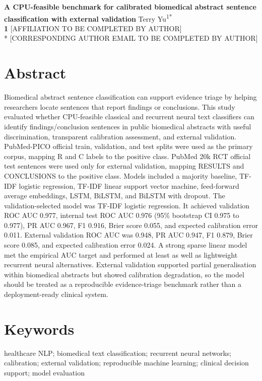 \documentclass[10pt,letterpaper]{article}
\begin{document}
\vspace*{0.2in}
\begin{flushleft}
{\Large\textbf{A CPU-feasible benchmark for calibrated biomedical abstract sentence classification with external validation}}
\newline
Terry Yu\textsuperscript{1*}
\\
\bigskip
\textbf{1} [AFFILIATION TO BE COMPLETED BY AUTHOR]
\\
\bigskip
* [CORRESPONDING AUTHOR EMAIL TO BE COMPLETED BY AUTHOR]
\end{flushleft}

\section*{Abstract}
Biomedical abstract sentence classification can support evidence triage by helping researchers locate sentences that report findings or conclusions. This study evaluated whether CPU-feasible classical and recurrent neural text classifiers can identify findings/conclusion sentences in public biomedical abstracts with useful discrimination, transparent calibration assessment, and external validation. PubMed-PICO official train, validation, and test splits were used as the primary corpus, mapping R and C labels to the positive class. PubMed 20k RCT official test sentences were used only for external validation, mapping RESULTS and CONCLUSIONS to the positive class. Models included a majority baseline, TF-IDF logistic regression, TF-IDF linear support vector machine, feed-forward average embeddings, LSTM, BiLSTM, and BiLSTM with dropout. The validation-selected model was TF-IDF logistic regression. It achieved validation ROC AUC 0.977, internal test ROC AUC 0.976 (95\% bootstrap CI 0.975 to 0.977), PR AUC 0.967, F1 0.916, Brier score 0.055, and expected calibration error 0.011. External validation ROC AUC was 0.948, PR AUC 0.947, F1 0.879, Brier score 0.085, and expected calibration error 0.024. A strong sparse linear model met the empirical AUC target and performed at least as well as lightweight recurrent neural alternatives. External validation supported partial generalisation within biomedical abstracts but showed calibration degradation, so the model should be treated as a reproducible evidence-triage benchmark rather than a deployment-ready clinical system.

\section*{Keywords}
healthcare NLP; biomedical text classification; recurrent neural networks; calibration; external validation; reproducible machine learning; clinical decision support; model evaluation
\end{document}
